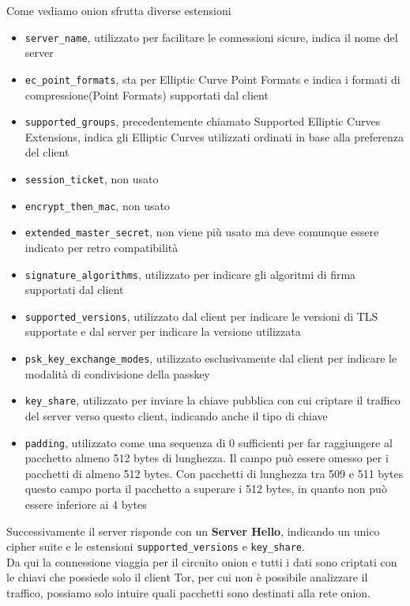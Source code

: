 \cite{TLSv1_3}
\newpage
Come vediamo onion sfrutta diverse estensioni
\begin{itemize}
    \item \lstinline{server_name}, utilizzato per facilitare le connessioni sicure, indica il nome del server\cite{RFC6066}
    \item \lstinline{ec_point_formats}, sta per Elliptic Curve Point Formats e indica i formati di compressione(Point Formats) supportati dal client\cite{RFC8422}
    \item \lstinline{supported_groups}, precedentemente chiamato Supported Elliptic Curves Extensions, indica gli Elliptic Curves utilizzati ordinati in base alla preferenza del client \cite{RFC8422}
    \item \lstinline{session_ticket}, non usato
    \item \lstinline{encrypt_then_mac}, non usato
    \item \lstinline{extended_master_secret}, non viene più usato ma deve comunque essere indicato per retro compatibilità\cite{RFC7627}
    \item \lstinline{signature_algorithms}, utilizzato per indicare gli algoritmi di firma supportati dal client\cite{RFC8446}
    \item \lstinline{supported_versions}, utilizzato dal client per indicare le versioni di TLS supportate e dal server per indicare la versione utilizzata \cite{RFC8446}
    \item \lstinline{psk_key_exchange_modes}, utilizzato esclusivamente dal client per indicare le modalità di condivisione della passkey\cite{RFC8446}
    \item \lstinline{key_share}, utilizzato per inviare la chiave pubblica con cui criptare il traffico del server verso questo client, indicando anche il tipo di chiave\cite{RFC8446}
    \item \lstinline{padding}, utilizzato come una sequenza di 0 sufficienti per far raggiungere al pacchetto almeno 512 bytes di lunghezza. Il campo può essere omesso per i pacchetti di almeno 512 bytes. Con pacchetti di lunghezza tra 509 e 511 bytes questo campo porta il pacchetto a superare i 512 bytes, in quanto non può essere inferiore ai 4 bytes\cite{RFC7685}
\end{itemize}
\newpage
Successivamente il server risponde con un \textbf{Server Hello}, indicando un unico cipher suite e le estensioni \lstinline{supported_versions} e \lstinline{key_share}.
\\
Da qui la connessione viaggia per il circuito onion e tutti i dati sono criptati con le chiavi che possiede solo il client Tor, per cui non è possibile analizzare il traffico, possiamo solo intuire quali pacchetti sono destinati alla rete onion.


